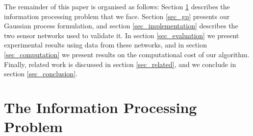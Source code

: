 \documentclass{acmtrans2m}
\begin{document}
The remainder of this paper is organised as follows: Section \ref{sec_info} describes the information processing problem that we face. Section \ref{sec_gp} presents our Gaussian process formulation, and section \ref{sec_implementation} describes the two sensor networks used to validate it. In section \ref{sec_evaluation} we present experimental results using data from these networks, and in section \ref{sec_computation} we present results on the computational cost of our algorithm. Finally, related work is discussed in section \ref{sec_related}, and we conclude in section \ref{sec_conclusion}.

\section{The Information Processing Problem}\label{sec_info}
\end{document}
